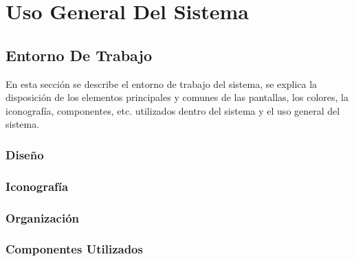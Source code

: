 \documentclass[oneside,10pt,letterpaper]{book}
\begin{document}
\maketitle
\frontmatter
\tableofcontents
\mainmatter
\chapter{Uso General Del Sistema}
\section{Entorno De Trabajo}
En esta sección se describe el entorno de trabajo del sistema, se explica la disposición
de los elementos principales y comunes de las pantallas, los colores, la iconografía, componentes, etc.
utilizados dentro del sistema y el uso general del sistema.

\subsection{Diseño}
	

\subsection{Iconografía}
	
\subsection{Organización}
	

\subsection{Componentes Utilizados}
	



\end{document}
